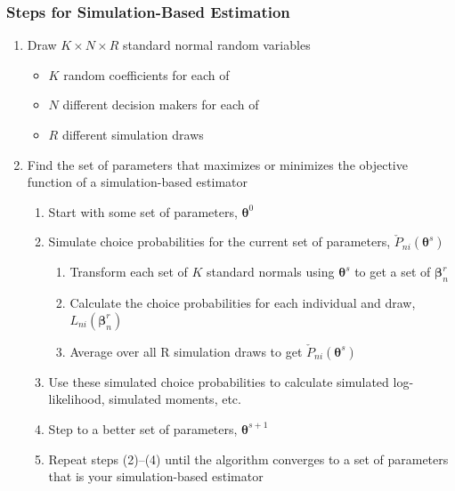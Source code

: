 \documentclass{beamer}\usepackage[]{graphicx}\usepackage[]{xcolor}
\begin{document}
\begin{frame}\frametitle{Steps for Simulation-Based Estimation}
    \begin{enumerate}
        \item Draw $K \times N \times R$ standard normal random variables
        \begin{itemize}
            \item $K$ random coefficients for each of
            \item $N$ different decision makers for each of
            \item $R$ different simulation draws
        \end{itemize}
        \item Find the set of parameters that maximizes or minimizes the objective function of a simulation-based estimator
        \begin{enumerate}
            \item Start with some set of parameters, $\bm{\theta}^0$
            \item Simulate choice probabilities for the current set of parameters, $\check{P}_{ni}(\bm{\theta}^s)$
            \begin{enumerate}
                \item Transform each set of $K$ standard normals using $\bm{\theta}^s$ to get a set of $\bm{\beta}_n^r$
                \item Calculate the choice probabilities for each individual and draw, $L_{ni}(\bm{\beta}_n^r)$
                \item Average over all R simulation draws to get $\check{P}_{ni}(\bm{\theta}^s)$
            \end{enumerate}
            \item Use these simulated choice probabilities to calculate simulated log-likelihood, simulated moments, etc.
            \item Step to a better set of parameters, $\bm{\theta}^{s + 1}$
            \item Repeat steps (2)--(4) until the algorithm converges to a set of parameters that is your simulation-based estimator
        \end{enumerate}
    \end{enumerate}
\end{frame}
\end{document}
